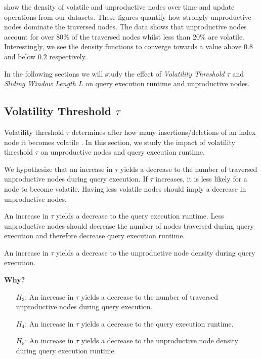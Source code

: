 \documentclass[abstracton,12pt]{scrartcl}
\theoremstyle{definition}
\begin{document}
show the density of volatile and unproductive nodes over time and update
operations from our datasets. These figures quantify how strongly unproductive
nodes dominate the traversed nodes. The data shows that unproductive nodes
account for over $80\%$ of the traversed nodes whilst less than $20\%$ are volatile. 
Interestingly, we see the density functions to converge towards a value above
$0.8$ and below $0.2$ respectively.

In the following sections we will study the effect of \textit{Volatility
  Threshold $\tau$} and \textit{Sliding Window Length $L$} on query execution runtime and
unproductive nodes.

\subsection{Volatility Threshold $\tau$}

Volatility threshold $\tau$ determines after how many insertions/deletions of an index node
it becomes volatile \cite{KW17}. In this section, we study the impact of
volatility threshold $\tau$ on unproductive nodes and query execution runtime.

We hypothesize that an increase in $\tau$ yields a decrease to the number of traversed unproductive
nodes during query execution. If $\tau$ increases, it is less likely for a node to become
volatile. Having less volatile nodes should imply a decrease in unproductive nodes.

An increase in $\tau$ yields a decrease to the query execution runtime. Less
unproductive nodes should decrease the number of nodes traversed
during query execution and therefore decrease query execution runtime.

An increase in $\tau$ yields a decrease to the unproductive node density during
query execution.

\textbf{Why?}

\begin{shaded}
  \begin{itemize}
  \item[$H_3$:] An increase in $\tau$ yields a decrease to the number of
    traversed unproductive nodes during query execution.
  \item[$H_4$:] An increase in $\tau$ yields a decrease to the query execution runtime. 
  \item[$H_5$:] An increase in $\tau$ yields a decrease to the unproductive node
    density during query execution runtime.
  \end{itemize}
\end{shaded}
\end{document}
